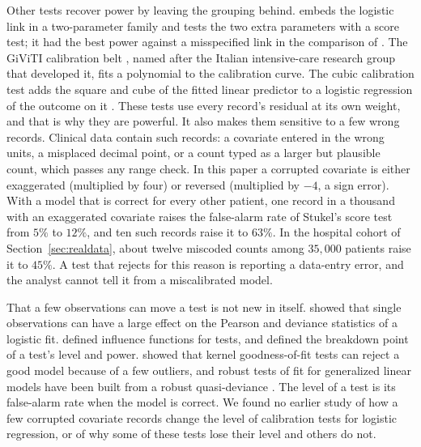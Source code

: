 Other tests recover power by leaving the grouping behind. \citet{stukel1988generalized} embeds the
logistic link in a two-parameter family and tests the two extra parameters with a score test; it had
the best power against a misspecified link in the comparison of \citet{hosmer1997comparison}. The
GiViTI calibration belt \citep{nattino2014new,nattino2015new}, named after the Italian intensive-care
research group that developed it, fits a polynomial to the calibration curve. The cubic calibration
test adds the square and cube of the fitted linear predictor to a logistic regression of the outcome
on it \citep{pregibon1980goodness,nattino2014new,nattino2015new}. These tests use every record's
residual at its own weight, and that is why they are powerful. It also makes them sensitive to a few
wrong records. Clinical data contain such records: a covariate entered in the wrong units, a misplaced
decimal point, or a count typed as a larger but plausible count, which passes any range check. In this
paper a corrupted covariate is either exaggerated (multiplied by four) or reversed (multiplied by $-4$,
a sign error). With a model that is correct for every other patient, one record in a thousand with an
exaggerated covariate raises the false-alarm rate of Stukel's score test from $5\%$ to $12\%$, and ten
such records raise it to $63\%$. In the hospital cohort of Section~\ref{sec:realdata}, about twelve
miscoded counts among $35{,}000$ patients raise it to $45\%$. A test that rejects for this reason is
reporting a data-entry error, and the analyst cannot tell it from a miscalibrated model.

That a few observations can move a test is not new in itself. \citet{pregibon1981logistic} showed
that single observations can have a large effect on the Pearson and deviance statistics of a logistic
fit. \citet{lambert1981influence} defined influence functions for tests, and \citet{he1990breakdown}
defined the breakdown point of a test's level and power. \citet{liubriol2025robustness} showed that
kernel goodness-of-fit tests can reject a good model because of a few outliers, and robust tests of fit
for generalized linear models have been built from a robust quasi-deviance \citep{cantoni2001robust}.
The level of a test is its false-alarm rate when the model is correct. We found no earlier study of how
a few corrupted covariate records change the level of calibration tests for logistic regression, or of
why some of these tests lose their level and others do not.

